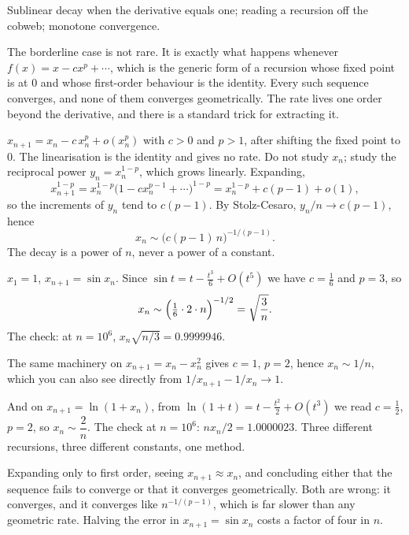 \begin{seealsob}Sublinear decay when the derivative equals one; reading a recursion off the cobweb; monotone convergence.\end{seealsob}

The borderline case is not rare. It is exactly what happens whenever $f(x)=x-cx^p+\cdots$, which is the generic form of a recursion whose fixed point is at $0$ and whose first-order behaviour is the identity. Every such sequence converges, and none of them converges geometrically. The rate lives one order beyond the derivative, and there is a standard trick for extracting it.

\cue $x_{n+1}=x_n-c\,x_n^{p}+o(x_n^{p})$ with $c>0$ and $p>1$, after shifting the fixed point to $0$. The linearisation is the identity and gives no rate.
\method Do not study $x_n$; study the reciprocal power $y_n=x_n^{1-p}$, which grows linearly. Expanding,
\[x_{n+1}^{1-p}=x_n^{1-p}\bigl(1-cx_n^{p-1}+\cdots\bigr)^{1-p}=x_n^{1-p}+c(p-1)+o(1),\]
so the increments of $y_n$ tend to $c(p-1)$. By Stolz-Cesaro, $y_n/n\to c(p-1)$, hence
\[x_n\sim\bigl(c(p-1)\,n\bigr)^{-1/(p-1)}.\]
The decay is a power of $n$, never a power of a constant.

\begin{worked}
$x_1=1$, $x_{n+1}=\sin x_n$. Since $\sin t=t-\tfrac{t^3}{6}+O(t^5)$ we have $c=\tfrac16$ and $p=3$, so
\[x_n\sim\Bigl(\tfrac16\cdot2\cdot n\Bigr)^{-1/2}=\sqrt{\frac{3}{n}}.\]
The check: at $n=10^6$, $x_n\sqrt{n/3}=0.9999946$.

The same machinery on $x_{n+1}=x_n-x_n^2$ gives $c=1$, $p=2$, hence $x_n\sim1/n$, which you can also see directly from $1/x_{n+1}-1/x_n\to1$.

And on $x_{n+1}=\ln(1+x_n)$, from $\ln(1+t)=t-\tfrac{t^2}{2}+O(t^3)$ we read $c=\tfrac12$, $p=2$, so $x_n\sim\dfrac{2}{n}$. The check at $n=10^6$: $nx_n/2=1.0000023$. Three different recursions, three different constants, one method.
\end{worked}

\begin{trap}
Expanding only to first order, seeing $x_{n+1}\approx x_n$, and concluding either that the sequence fails to converge or that it converges geometrically. Both are wrong: it converges, and it converges like $n^{-1/(p-1)}$, which is far slower than any geometric rate. Halving the error in $x_{n+1}=\sin x_n$ costs a factor of four in $n$.
\end{trap}

